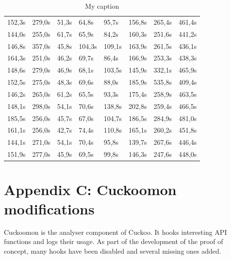 \documentclass{scrartcl}
\begin{document}
\begin{table}[h]
\begin{tabular}{@{}llllllll@{}}
152,3s  & 279,0s  & 51,3s       & 64,8s       & 95,7s        & 156,8s       & 265,4s       & 461,4s        \\
144,0s  & 255,0s  & 61,7s       & 65,9s       & 84,2s        & 160,3s       & 251,6s       & 441,2s        \\
146,8s  & 357,0s  & 45,8s       & 104,3s      & 109,1s       & 163,9s       & 261,5s       & 436,1s        \\
164,3s  & 251,0s  & 46,2s       & 69,7s       & 86,4s        & 166,9s       & 253,3s       & 438,3s        \\
148,6s  & 279,0s  & 46,9s       & 68,1s       & 103,5s       & 145,9s       & 332,1s       & 465,9s        \\
152,5s  & 275,0s  & 48,3s       & 69,6s       & 88,0s        & 185,9s       & 535,8s       & 409,4s        \\
146,2s  & 265,0s  & 61,2s       & 65,5s       & 93,3s        & 175,4s       & 258,9s       & 463,5s        \\
148,1s  & 298,0s  & 54,1s       & 70,6s       & 138,8s       & 202,8s       & 259,4s       & 466,5s        \\
185,5s  & 256,0s  & 45,7s       & 67,0s       & 104,7s       & 186,5s       & 284,9s       & 481,0s        \\
161,1s  & 256,0s  & 42,7s       & 74,4s       & 110,8s       & 165,1s       & 260,2s       & 451,8s        \\
144,1s  & 271,0s  & 54,1s       & 70,4s       & 95,8s        & 139,7s       & 267,6s       & 446,4s        \\
151,9s  & 277,0s  & 45,9s       & 69,5s       & 99,8s        & 146,3s       & 247,6s       & 448,0s        \\ \bottomrule
\end{tabular}
\caption{My caption}
\label{my-label}
\end{table}

\clearpage

\section*{Appendix C: Cuckoomon modifications}
\label{cuckoomonmods}

Cuckoomon is the analyser component of Cuckoo. It hooks interesting API functions and logs their usage. As part of the development of the proof of concept, many hooks have been disabled and several missing ones added.
\end{document}
